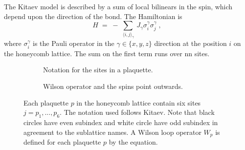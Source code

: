 The Kitaev model is described by a sum of local bilinears in the spin, which depend upon the direction of the bond. The Hamiltonian is
\begin{equation}
    H \; = \; -   \, \sum_{\, \langle i,j \rangle_{\gamma} }  \, J_{\gamma} \sigma_{i}^{\gamma} \sigma_{j}^{\gamma} \; , %
\end{equation}
where $ \sigma_{i}^{\gamma}$ is the Pauli operator in the $\gamma \in \{ x , y , z \} $ direction at the position $i$ on the honeycomb lattice. The sum on the first term runs over \acrshort{nn} sites. %



\begin{figure}[t]
    \centering
    \begin{subfigure}{.45\textwidth}
        \centering
        \scalebox{1.5}{ } 
        \caption{Notation for the sites in a plaquette.}
        \label{fig:2-plaquette-notation}
    \end{subfigure} \hspace{5mm}%
    \begin{subfigure}{.45\textwidth}
        \centering
        \scalebox{1.5}{ }
        \caption{Wilson operator and the spins point outwards.%
        }
        \label{fig:2-plaquette-spin}
    \end{subfigure}
\caption{Each plaquette $p$ in the honeycomb lattice contain six sites $j=p_1,...,p_6$. The notation used follows Kitaev. Note that black circles have even subindex and white circle have odd subindex in agreement to the sublattice names. A Wilson loop operator $W_p$ is defined for each plaquette $p$ by the equation.}
\end{figure}


